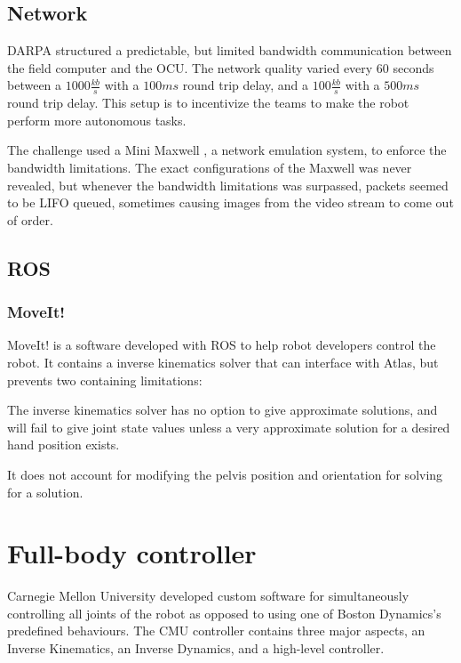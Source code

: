 \documentclass[12pt]{report}
\begin{document}
\subsection{Network}

DARPA structured a predictable, but limited bandwidth communication between the field computer and the OCU. The network quality varied every 60 seconds between a $1000 \frac{kb}{s}$ with a $100ms$ round trip delay, and a $100 \frac{kb}{s}$ with a $500ms$ round trip delay. This setup is to incentivize the teams to make the robot perform more autonomous tasks.

The challenge used a Mini Maxwell \cite{minimaxwell}, a network emulation system, to enforce the bandwidth limitations. The exact configurations of the Maxwell was never revealed, but whenever the bandwidth limitations was surpassed, packets seemed to be LIFO queued, sometimes causing images from the video stream to come out of order. 

\subsection{ROS}


\subsubsection{MoveIt!}
MoveIt! is a software developed with ROS to help robot developers control the robot. It contains a inverse kinematics solver that can interface with Atlas, but prevents two containing limitations: 
\begin{inparaenum}
\item The inverse kinematics solver has no option to give approximate solutions, and will fail to give joint state values unless a very approximate solution for a desired hand position exists.
\item It does not account for modifying the pelvis position and orientation for solving for a solution. \end{inparaenum}

\section{Full-body controller}
Carnegie Mellon University developed custom software for simultaneously controlling all joints of the robot as opposed to using one of Boston Dynamics's predefined behaviours. The CMU controller contains three major aspects, an Inverse Kinematics, an Inverse Dynamics, and a high-level controller. 
\end{document}
